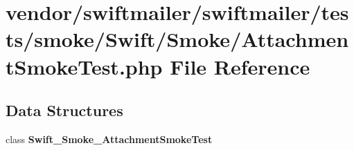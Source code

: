 \section{vendor/swiftmailer/swiftmailer/tests/smoke/\+Swift/\+Smoke/\+Attachment\+Smoke\+Test.php File Reference}
\label{_attachment_smoke_test_8php}
\subsection*{Data Structures}
\begin{DoxyCompactItemize}
\item 
class {\bf Swift\+\_\+\+Smoke\+\_\+\+Attachment\+Smoke\+Test}
\end{DoxyCompactItemize}
